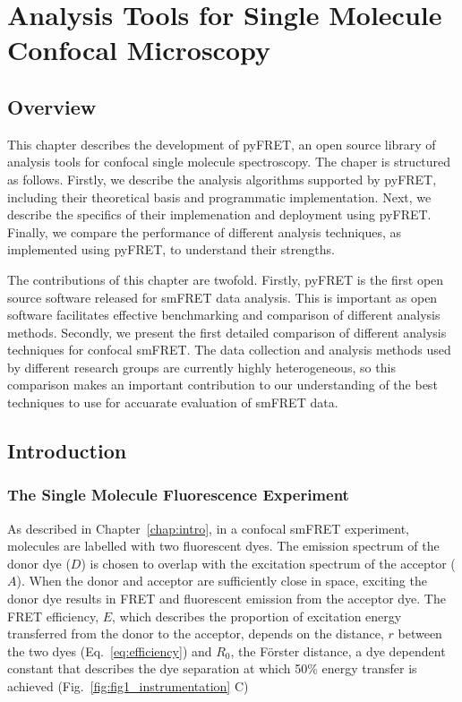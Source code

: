 \chapter{Analysis Tools for Single Molecule Confocal Microscopy}
\label{chap:pyfret}
\section{Overview}
This chapter describes the development of pyFRET, an open source library of analysis tools for confocal single molecule spectroscopy. The chaper is structured as follows. Firstly, we describe the analysis algorithms supported by pyFRET, including their theoretical basis and programmatic implementation. Next, we describe the specifics of their implemenation and deployment using pyFRET. Finally, we compare the performance of different analysis techniques, as implemented using pyFRET, to understand their strengths. 

The contributions of this chapter are twofold. Firstly, pyFRET is the first open source software released for smFRET data analysis. This is important as open software facilitates effective benchmarking and comparison of different analysis methods. Secondly, we present the first detailed comparison of different analysis techniques for confocal smFRET. The data collection and analysis methods used by different research groups are currently highly heterogeneous, so this comparison makes an important contribution to our understanding of the best techniques to use for accuarate evaluation of smFRET data.  

\section{Introduction}
\subsection{The Single Molecule Fluorescence Experiment}

As described in Chapter~\ref{chap:intro}, in a confocal smFRET experiment, molecules are labelled with two fluorescent dyes. The emission spectrum of the donor dye ($D$) is chosen to overlap with the excitation spectrum of the acceptor ($A$). When the donor and acceptor are sufficiently close in space, exciting the donor dye results in FRET and fluorescent emission from the acceptor dye. The FRET efficiency, $E$, which describes the proportion of excitation energy transferred from the donor to the acceptor, depends on the distance, $r$ between the two dyes (Eq.~\ref{eq:efficiency}) and $R_0$, the F\"{o}rster distance, a dye dependent constant that describes the dye separation at which 50\% energy transfer is achieved (Fig.~\ref{fig:fig1_instrumentation} C)

